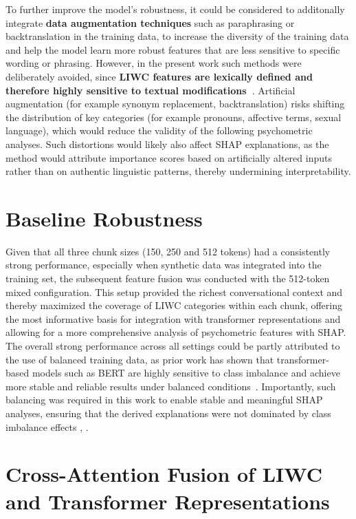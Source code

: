 To further improve the model's robustness, it could be considered to additonally integrate \textbf{data augmentation techniques} such as paraphrasing or backtranslation in the training data, to increase the diversity of the training data and help the model learn more robust features that are less sensitive to specific wording or phrasing. However, in the present work such methods were deliberately avoided, since \textbf{LIWC features are lexically defined and therefore highly sensitive to textual modifications~\cite{tausczik2010psychological}}. Artificial augmentation (for example synonym replacement, backtranslation) risks shifting the distribution of key categories (for example pronouns, affective terms, sexual language), which would reduce the validity of the following psychometric analyses. Such distortions would likely also affect SHAP explanations, as the method would attribute importance scores based on artificially altered inputs rather than on authentic linguistic patterns, thereby undermining interpretability. 

\section{Baseline Robustness}
Given that all three chunk sizes (150, 250 and 512 tokens) had a consistently strong performance, especially when synthetic data was integrated into the training set, the subsequent feature fusion was conducted with the 512-token mixed configuration. This setup provided the richest conversational context and thereby maximized the coverage of LIWC categories within each chunk, offering the most informative basis for integration with transformer representations and allowing for a more comprehensive analysis of psychometric features with SHAP. The overall strong performance across all settings could be partly attributed to the use of balanced training data, as prior work has shown that transformer-based models such as BERT are highly sensitive to class imbalance and achieve more stable and reliable results under balanced conditions~\cite{henningnlpclassimbalance2023}. Importantly, such balancing was required in this work to enable stable and meaningful SHAP analyses, ensuring that the derived explanations were not dominated by class imbalance effects \parencite{liu2022balancedbackgroundexplanationdata}, \parencite{chen2024interpretable}. 


\section{Cross-Attention Fusion of LIWC and Transformer Representations}

